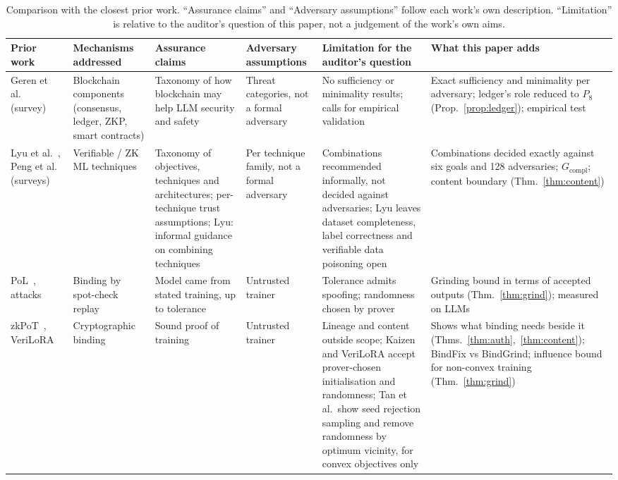 \begin{table}[t]
\centering\scriptsize
\caption{Comparison with the closest prior work. ``Assurance claims'' and ``Adversary
assumptions'' follow each work's own description. ``Limitation'' is relative to the auditor's
question of this paper, not a judgement of the work's own aims.}\label{tab:compare}
\begin{tabular}{@{}p{2.1cm}p{2.2cm}p{2.4cm}p{2.3cm}p{3.1cm}p{3.4cm}@{}}
\toprule
Prior work & Mechanisms addressed & Assurance claims & Adversary assumptions & Limitation for the auditor's question & What this paper adds\\
\midrule
Geren et al.~\cite{geren2025blockchain} (survey) & Blockchain components (consensus, ledger, ZKP, smart contracts) & Taxonomy of how blockchain may help LLM security and safety & Threat categories, not a formal adversary & No sufficiency or minimality results; calls for empirical validation & Exact sufficiency and minimality per adversary; ledger's role reduced to $P_8$ (Prop.~\ref{prop:ledger}); empirical test\\
Lyu et al.~\cite{lyu2026survey}, Peng et al.~\cite{peng2026zkp} (surveys) & Verifiable / ZK ML techniques & Taxonomy of objectives, techniques and architectures; per-technique trust assumptions; Lyu: informal guidance on combining techniques & Per technique family, not a formal adversary & Combinations recommended informally, not decided against adversaries; Lyu leaves dataset completeness, label correctness and verifiable data poisoning open & Combinations decided exactly against six goals and 128 adversaries; $G_{\mathrm{compl}}$; content boundary (Thm.~\ref{thm:content})\\
PoL~\cite{jia2021pol}, attacks~\cite{fang2023pol} & Binding by spot-check replay & Model came from stated training, up to tolerance & Untrusted trainer & Tolerance admits spoofing; randomness chosen by prover & Grinding bound in terms of accepted outputs (Thm.~\ref{thm:grind}); measured on LLMs\\
zkPoT~\cite{abbaszadeh2024zkpot,tan2025zkpot}, VeriLoRA~\cite{liao2026verilora} & Cryptographic binding & Sound proof of training & Untrusted trainer & Lineage and content outside scope; Kaizen and VeriLoRA accept prover-chosen initialisation and randomness; Tan et al.\ show seed rejection sampling and remove randomness by optimum vicinity, for convex objectives only & Shows what binding needs beside it (Thms.~\ref{thm:auth},~\ref{thm:content}); BindFix vs BindGrind; influence bound for non-convex training (Thm.~\ref{thm:grind})\\

\end{tabular}
\end{table}
